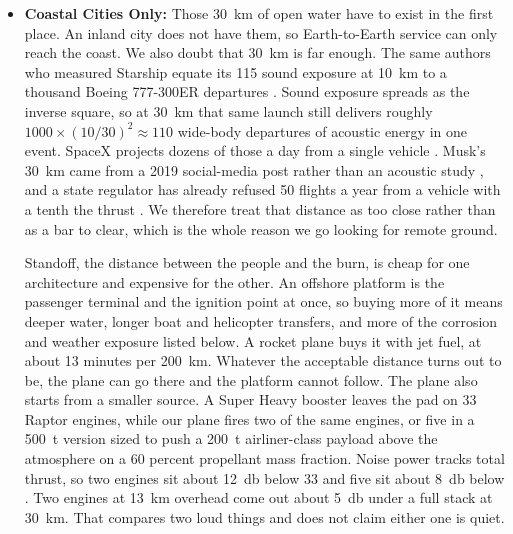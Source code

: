 \documentclass{article}
\begin{document}
\begin{itemize}
\item \textbf{Coastal Cities Only:} Those \SI{30}{\kilo\meter} of open water have to exist in the first place. An inland city does not have them, so Earth-to-Earth service can only reach the coast. We also doubt that \SI{30}{\kilo\meter} is far enough. The same authors who measured Starship equate its \SI{115}{\dBA} sound exposure at \SI{10}{\kilo\meter} to a thousand Boeing 777-300ER departures \cite{gee2025starship_acoustics}. Sound exposure spreads as the inverse square, so at \SI{30}{\kilo\meter} that same launch still delivers roughly $1000 \times (10/30)^2 \approx 110$ wide-body departures of acoustic energy in one event. SpaceX projects dozens of those a day from a single vehicle \cite{shotwell_ted_2018}. Musk's \SI{30}{\kilo\meter} came from a 2019 social-media post rather than an acoustic study \cite{musk_offshore_noise}, and a state regulator has already refused 50 flights a year from a vehicle with a tenth the thrust \cite{ccc_vandenberg_2024}. We therefore treat that distance as too close rather than as a bar to clear, which is the whole reason we go looking for remote ground.

Standoff, the distance between the people and the burn, is cheap for one architecture and expensive for the other. An offshore platform is the passenger terminal and the ignition point at once, so buying more of it means deeper water, longer boat and helicopter transfers, and more of the corrosion and weather exposure listed below. A rocket plane buys it with jet fuel, at about 13 minutes per \SI{200}{\kilo\meter}. Whatever the acceptable distance turns out to be, the plane can go there and the platform cannot follow. The plane also starts from a smaller source. A Super Heavy booster leaves the pad on 33 Raptor engines, while our plane fires two of the same engines, or five in a \SI{500}{\tonne} version sized to push a \SI{200}{\tonne} airliner-class payload above the atmosphere on a 60 percent propellant mass fraction. Noise power tracks total thrust, so two engines sit about \SI{12}{\decibel} below 33 and five sit about \SI{8}{\decibel} below \cite{gee2025starship_acoustics}. Two engines at \SI{13}{\kilo\meter} overhead come out about \SI{5}{\decibel} under a full stack at \SI{30}{\kilo\meter}. That compares two loud things and does not claim either one is quiet.


\end{itemize}
\end{document}

